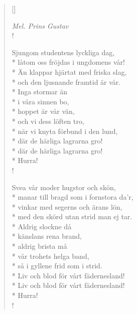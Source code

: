 
\settowidth{\versewidth}{Än klappar hjärtat med friska slag,}



\begin{verse}[\versewidth]

\flagverse{}
\emph{Mel. Prins Gustav}\\!

Sjungom studentens lyckliga dag,\\*
låtom oss fröjdas i ungdomens vår!\\*
Än klappar hjärtat med friska slag,\\*
och den ljusnande framtid är vår.\\*
Inga stormar än\\*
i våra sinnen bo,\\*
hoppet är vår vän,\\*
och vi dess löften tro,\\*
när vi knyta förbund i den lund,\\*
där de härliga lagrarna gro!\\*
där de härliga lagrarna gro!\\*
Hurra!\\!


Svea vår moder hugstor och skön,\\*
manar till bragd som i fornstora da'r,\\*
vinkar med segerns och ärans lön,\\*
med den skörd utan strid man ej tar.\\*
Aldrig slockne då\\*
känslans rena brand,\\*
aldrig brista må\\*
vår trohets helga band,\\*
så i gyllene frid som i strid.\\*
Liv och blod för vårt fädernesland!\\*
Liv och blod för vårt fädernesland!\\*
Hurra!\\!




\end{verse}

